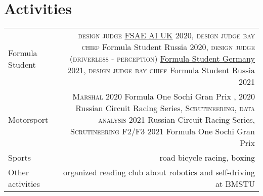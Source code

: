 \section*{Activities}
\vspace{-0.5em}
\begin{tabular}{@{}L!{\VRule}R}

    Formula Student  & {\textsc{design judge}} \href{https://www.imeche.org/events/formula-student/team-information/fs-ai}{FSAE AI UK} 2020,
    {\textsc{design judge bay chief}} Formula Student Russia 2020,
    {\textsc{design judge (driverless - perception)}} \href{https://www.formulastudent.de/fsg/}{Formula Student Germany} 2021,
    {\textsc{design judge bay chief}} Formula Student Russia 2021                                                                            \\
    Motorsport       & {\textsc{Marshal}} 2020 Formula One Sochi Gran Prix , 2020 Russian Circuit Racing Series,
    {\textsc{Scrutineering, data analysis}} 2021 Russian Circuit Racing Series,
    {\textsc{Scrutineering F2/F3}} 2021 Formula One Sochi Gran Prix                                                                          \\
    Sports           & road bicycle racing, boxing                                                                                           \\
    Other activities & organized reading club about robotics and self-driving at BMSTU
\end{tabular}